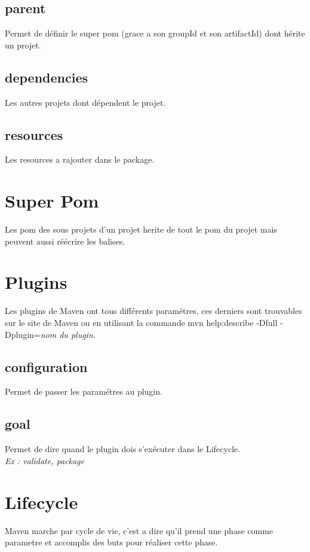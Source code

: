 \documentclass[a4paper,10pt]{article}
\begin{document}
\subsection{parent}
Permet de définir le super pom (grace a son groupId et son artifactId) dont hérite un projet.

\subsection{dependencies}
Les autres projets dont dépendent le projet.

\subsection{resources}
Les resources a rajouter dans le package.

\section{Super Pom}
Les pom des sous projets d'un projet herite de tout le pom du projet mais peuvent aussi réécrire les balises.

\section{Plugins}
Les plugins de Maven ont tous différents paramétres, ces derniers sont trouvables sur le site de Maven ou en utilisant la commande mvn help:describe -Dfull -Dplugin=\textit{nom du plugin}.

\subsection{configuration}
Permet de passer les paramétres au plugin.

\subsection{goal}
Permet de dire quand le plugin dois s'exécuter dans le Lifecycle.\\
\textit{Ex : validate, package}

\section{Lifecycle}
Maven marche par cycle de vie, c'est a dire qu'il prend une phase comme parametre et accomplis des buts pour réaliser cette phase.
\end{document}
